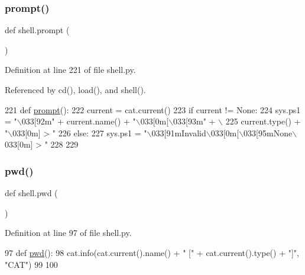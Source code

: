 \subsubsection{\texorpdfstring{prompt()}{prompt()}}
{\footnotesize\ttfamily def shell.\+prompt (\begin{DoxyParamCaption}{ }\end{DoxyParamCaption})}



Definition at line 221 of file shell.\+py.



Referenced by cd(), load(), and shell().


\begin{DoxyCode}
221 \textcolor{keyword}{def }\hyperlink{namespaceshell_af141a2fee68e5e84d8ac2cc51c3feedd}{prompt}():
222   current = cat.current()
223   \textcolor{keywordflow}{if} current != \textcolor{keywordtype}{None}:
224     sys.ps1 = \textcolor{stringliteral}{"\(\backslash\)033[92m"} + current.name() + \textcolor{stringliteral}{"\(\backslash\)033[0m[\(\backslash\)033[93m"} + \(\backslash\)
225         current.type() + \textcolor{stringliteral}{"\(\backslash\)033[0m] > "}
226   \textcolor{keywordflow}{else}:
227     sys.ps1 = \textcolor{stringliteral}{"\(\backslash\)033[91mInvalid\(\backslash\)033[0m[\(\backslash\)033[95mNone\(\backslash\)033[0m] > "}
228 
229 
\end{DoxyCode}
\mbox{\label{namespaceshell_ac92525a6872e660926b18f1047e21ee7}} 
\subsubsection{\texorpdfstring{pwd()}{pwd()}}
{\footnotesize\ttfamily def shell.\+pwd (\begin{DoxyParamCaption}{ }\end{DoxyParamCaption})}



Definition at line 97 of file shell.\+py.


\begin{DoxyCode}
97 \textcolor{keyword}{def }\hyperlink{namespaceshell_ac92525a6872e660926b18f1047e21ee7}{pwd}():
98   cat.info(cat.current().name() + \textcolor{stringliteral}{" ["} + cat.current().type() + \textcolor{stringliteral}{"]"}, \textcolor{stringliteral}{"CAT"})
99 
100 
\end{DoxyCode}
\mbox{\label{namespaceshell_a406c1a03890c85fe979d6d8e540b3bdf}} 
